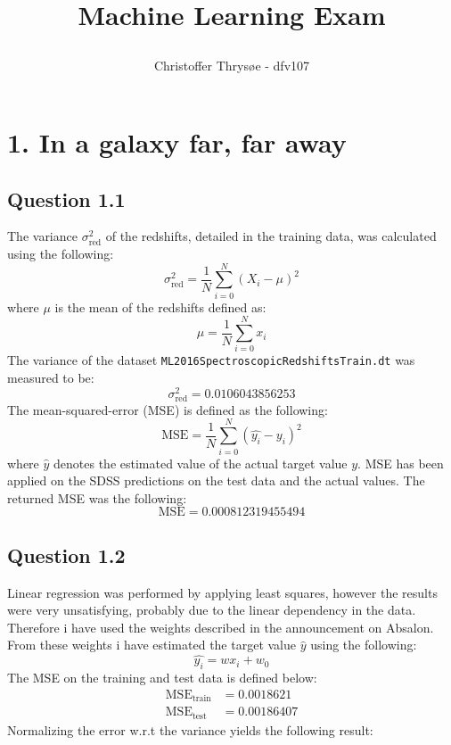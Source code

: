 \documentclass{article}
\title{
\vspace{1in}
\textmd{\textbf{Machine Learning Exam}} \\
\author{Christoffer Thrysøe - dfv107}
}
\begin{document}
\maketitle
{}
\section{1. In a galaxy far, far away}
\subsection{Question 1.1}
The variance $\sigma^ 2_{\text{red}}$ of the redshifts, detailed in the training data, was calculated using the following:
\begin{equation}
\sigma^2_{\text{red}} = \dfrac{1}{N} \sum\limits_{i=0}^N(X_i-\mu)^2
\end{equation}
where $\mu$ is the mean of the redshifts defined as:
\begin{equation}
\mu = \dfrac{1}{N} \sum\limits_{i=0}^N x_i
\end{equation}
The variance of the dataset \texttt{ML2016SpectroscopicRedshiftsTrain.dt} was measured to be:
$$
\sigma^ 2_{\text{red}} = 0.0106043856253
$$
The mean-squared-error (MSE) is defined as the following:
\begin{equation}
\text{MSE} = \dfrac{1}{N} \sum\limits_{i=0}^N (\hat{y_i} - y_i)^2 
\end{equation}
where $\hat{y}$ denotes the estimated value of the actual target value $y$. 
MSE has been applied on the SDSS predictions on the test data and the actual values. The returned MSE was the following:
$$
\text{MSE} = 0.000812319455494
$$
\subsection{Question 1.2}
Linear regression was performed by applying least squares, however the results were very unsatisfying, probably due to the linear dependency in the data. Therefore i have used the weights described in the announcement on Absalon. From these weights i have estimated the target value $\hat{y}$ using the following:
\begin{equation}
\hat{y_i} = wx_i+w_0
\end{equation}
The MSE on the training and test data is defined below:
\begin{align*}
\text{MSE}_{\text{train}} &=  0.0018621 \\
\text{MSE}_{\text{test}} &= 0.00186407
\end{align*}
Normalizing the error w.r.t the variance yields the following result:
\end{document}
